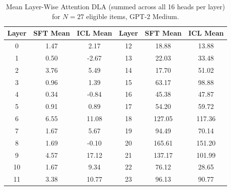 \documentclass[11pt]{article}
\begin{document}
\begin{table}[H]
\centering
\caption{Mean Layer-Wise Attention DLA (summed across all 16 heads per layer)
for $N=27$ eligible items, GPT-2 Medium.}
\label{tab:layer_dla_raw}
\begin{tabular}{cccccc}
\toprule
\textbf{Layer} & \textbf{SFT Mean} & \textbf{ICL Mean} & \textbf{Layer} & \textbf{SFT Mean} & \textbf{ICL Mean} \\
\midrule
 0 &   1.47 &   2.17 & 12 &  18.88 &  13.88 \\
 1 &   0.50 &  -2.67 & 13 &  22.03 &  33.48 \\
 2 &   3.76 &   5.49 & 14 &  17.70 &  51.02 \\
 3 &   0.96 &   1.39 & 15 &  63.17 &  98.88 \\
 4 &   0.34 &  -0.84 & 16 &  45.38 &  47.87 \\
 5 &   0.91 &   0.89 & 17 &  54.20 &  59.72 \\
 6 &   6.55 &  11.08 & 18 & 127.05 & 117.36 \\
 7 &   1.67 &   5.67 & 19 &  94.49 &  70.14 \\
 8 &   1.69 &  -0.10 & 20 & 165.61 & 151.20 \\
 9 &   4.57 &  17.12 & 21 & 137.17 & 101.99 \\
10 &   1.67 &   9.34 & 22 &  76.12 &  28.65 \\
11 &   3.38 &  10.77 & 23 &  96.13 &  90.77 \\
\bottomrule
\end{tabular}
\end{table}
\end{document}
